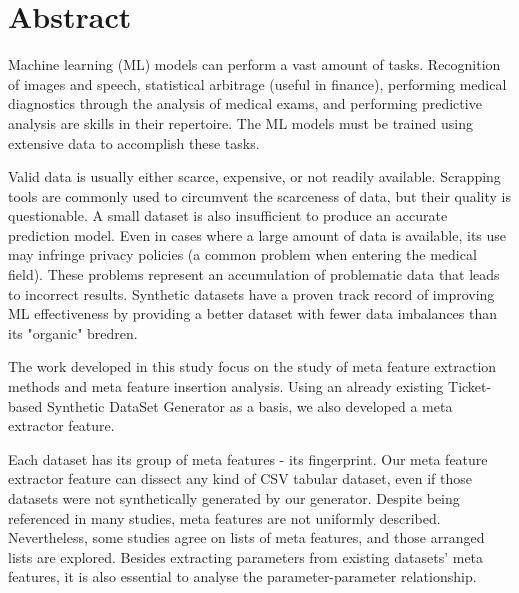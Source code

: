 \chapter*{Abstract}
Machine learning (ML) models can perform a vast amount of tasks. Recognition of images and speech, statistical arbitrage (useful in finance), performing medical diagnostics through the analysis of medical exams, and performing predictive analysis are skills in their repertoire. The ML models must be trained using extensive data to accomplish these tasks.

Valid data is usually either scarce, expensive, or not readily available. Scrapping tools are commonly used to circumvent the scarceness of data, but their quality is questionable. A small dataset is also insufficient to produce an accurate prediction model. Even in cases where a large amount of data is available, its use may infringe privacy policies (a common problem when entering the medical field). These problems represent an accumulation of problematic data that leads to incorrect results. Synthetic datasets have a proven track record of improving ML effectiveness by providing a better dataset with fewer data imbalances than its "organic" bredren. 

The work developed in this study focus on the study of meta feature extraction methods and meta feature insertion analysis. Using an already existing Ticket-based Synthetic DataSet Generator as a basis, we also developed a meta extractor feature.

Each dataset has its group of meta features - its fingerprint. Our meta feature extractor feature can dissect any kind of CSV tabular dataset, even if those datasets were not synthetically generated by our generator.
Despite being referenced in many studies, meta features are not uniformly described. Nevertheless, some studies agree on lists of meta features, and those arranged lists are explored. Besides extracting parameters from existing datasets' meta features, it is also essential to analyse the parameter-parameter relationship.

